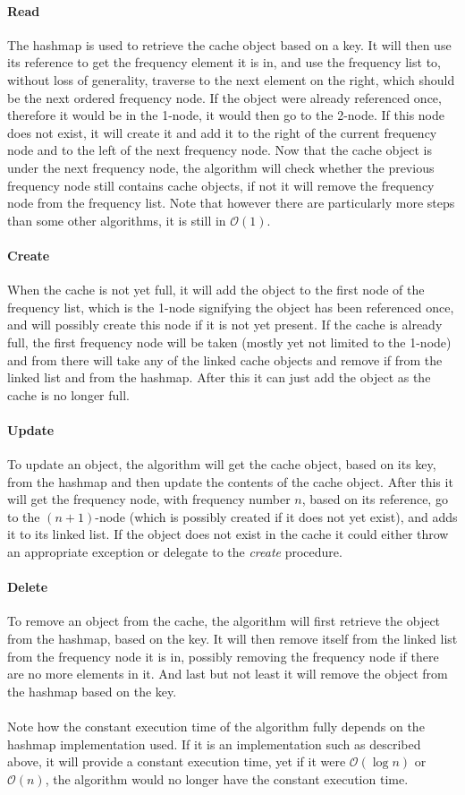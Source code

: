 \documentclass[pdftex,a4paper,12pt,twoside]{report}
\begin{document}
\paragraph{Read} The hashmap is used to retrieve the cache object based on a key. It will then use its reference to get the frequency element it is in, and use the frequency list to, without loss of generality, traverse to the next element on the right, which should be the next ordered frequency node. If the object were already referenced once, therefore it would be in the 1-node, it would then go to the 2-node. If this node does not exist, it will create it and add it to the right of the current frequency node and to the left of the next frequency node. Now that the cache object is under the next frequency node, the algorithm will check whether the previous frequency node still contains cache objects, if not it will remove the frequency node from the frequency list. Note that however there are particularly more steps than some other algorithms, it is still in $\mathcal{O}(1)$.
\paragraph{Create} When the cache is not yet full, it will add the object to the first node of the frequency list, which is the 1-node signifying the object has been referenced once, and will possibly create this node if it is not yet present. If the cache is already full, the first frequency node will be taken (mostly yet not limited to the 1-node) and from there will take any of the linked cache objects and remove if from the linked list and from the hashmap. After this it can just add the object as the cache is no longer full.
\paragraph{Update} To update an object, the algorithm will get the cache object, based on its key, from the hashmap and then update the contents of the cache object. After this it will get the frequency node, with frequency number $n$, based on its reference, go to the $(n+1)$-node (which is possibly created if it does not yet exist), and adds it to its linked list. If the object does not exist in the cache it could either throw an appropriate exception or delegate to the \emph{create} procedure.
\paragraph{Delete} To remove an object from the cache, the algorithm will first retrieve the object from the hashmap, based on the key. It will then remove itself from the linked list from the frequency node it is in, possibly removing the frequency node if there are no more elements in it. And last but not least it will remove the object from the hashmap based on the key.
\\\\
Note how the constant execution time of the algorithm fully depends on the hashmap implementation used. If it is an implementation such as described above, it will provide a constant execution time, yet if it were $\mathcal{O}(\log n)$ or $\mathcal{O}(n)$, the algorithm would no longer have the constant execution time.
\end{document}
